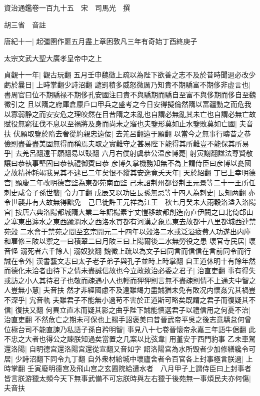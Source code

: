 資治通鑑卷一百九十五　宋　司馬光　撰

胡三省　音註

唐紀十一|{
	起彊圉作噩五月盡上章困敦凡三年有奇始丁酉終庚子}


太宗文武大聖大廣孝皇帝中之上

貞觀十一年|{
	觀古玩翻}
五月壬申魏徵上疏以為陛下欲善之志不及於昔時聞過必改少虧於曩日|{
	上時掌翻少詩沼翻}
譴罰積多威怒微厲乃知貴不期驕富不期侈非虚言也|{
	書周官曰位不期驕禄不期侈孔安國注曰貴不與驕期而驕自至富不與侈期而侈自至魏徵引之}
且以隋之府庫倉廪戶口甲兵之盛考之今日安得擬倫然隋以富疆動之而危我以寡弱静之而安安危之理皎然在目昔隋之未亂也自謂必無亂其未亡也自謂必無亡故賦役無窮征伐不息以至禍將及身而尚未之寤也夫鑒形莫如止水鑒敗莫如亡國|{
	夫音扶}
伏願取鑒於隋去奢從約親忠遠佞|{
	去羌呂翻遠于願翻}
以當今之無事行疇昔之恭儉則盡善盡美固無得而稱焉夫取之實難守之甚易陛下能得其所難豈不能保其所易乎|{
	去羌呂翻遠干願翻易以豉翻}
六月右僕射虞恭公温彦博薨|{
	射寅謝翻諡法尊賢敬讓曰恭執事堅固曰恭執禮御賓曰恭}
彦博久掌機務知無不為上謂侍臣曰彦博以憂國之故精神耗竭我見其不逮已二年矣恨不縱其安逸竟夭天年|{
	天於紹翻}
丁巳上幸明德宫|{
	顯慶二年改明德宫監為東都苑南面監}
己未詔荆州都督荆王元景等二十一王所任刺史咸令子孫世襲|{
	令力丁翻}
戊辰又以功臣長孫無忌等十四人為刺史|{
	長知两翻}
亦令世襲非有大故無得黜免　己巳徙許王元祥為江王　秋七月癸未大雨穀洛溢入洛陽宫|{
	按唐六典洛陽都城隋大業二年詔楊素宇丈愷移故都創造南直伊闕之口北倚邙山之塞東出瀍水之東西踰澗水之西洛水貫都有河漢之象焉東去故都十八里都城西連禁苑穀二水會于禁苑之間至玄宗開元二十四年以穀洛二水或泛溢疲費人功遂出内庫和雇修三陂以禦之一曰積翠二曰月陂三曰上陽爾後二水無勞役之患}
壞官寺民居|{
	壞音怪}
溺死者六千餘人|{
	溺奴狄翻}
魏徵上疏以為文子曰同言而信信在言前同令而行誠在令外|{
	漢書藝文志曰太子老子弟子與孔子並時上時掌翻}
自王道休明十有餘年然而德化未洽者由待下之情未盡誠信故也今立政致治必委之君子|{
	治直吏翻}
事有得失或訪之小人其待君子也敬而疎遇小人也輕而狎狎則言無不盡疎則情不上通夫中智之人豈無小慧|{
	夫音扶}
然才非經國慮不及遠雖竭力盡誠猶未免有敗况内懷姦宄其禍豈不深乎|{
	宄音軌}
夫雖君子不能無小過苟不害於正道斯可略矣既謂之君子而復疑其不信|{
	復扶又翻}
何異立直木而疑其影之曲乎陛下誠能慎選君子以禮信用之何憂不治|{
	治直吏翻}
不然危亡之期未可保也上賜手詔褒美曰昔晉武帝平吳之後志意驕怠何曾位極台司不能直諫乃私語子孫自矜明智|{
	事見八十七卷晉懷帝永嘉三年語牛倨翻}
此不忠之大者也得公之諫朕知過矣當置之几案以比弦韋|{
	用堇安于西門豹事}
乙未車駕還洛陽|{
	自明德宫還洛陽宫還從宣翻又音如字}
詔洛陽宫為水所毁者少加修繕纔令可居|{
	少詩沼翻下同令九丁翻}
自外衆材給城中壞廬舍者令百官各上封事極言朕過|{
	上時掌翻}
壬寅廢明德宫及飛山宫之玄圃院給遭水者　八月甲子上謂侍臣曰上封事者皆言朕游獵太頻今天下無事武備不可忘朕時與左右獵于後苑無一事煩民夫亦何傷|{
	夫音扶}
